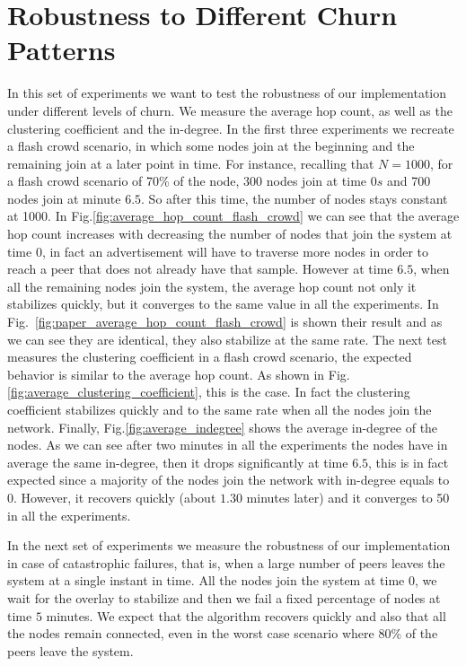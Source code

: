 \section{Robustness to Different Churn Patterns}
\label{sec:robustness}
In this set of experiments we want to test the robustness of our implementation under different levels of churn. We measure the average hop count, as well as the clustering coefficient and the in-degree. In the first three experiments we recreate a flash crowd scenario, in which some nodes join at the beginning and the remaining join at a later point in time. For instance, recalling that $N = 1000$, for a flash crowd scenario of 70\% of the node, 300 nodes join at time $0s$ and 700 nodes join at minute $6.5$. So after this time, the number of nodes stays constant at 1000. In Fig.\ref{fig:average_hop_count_flash_crowd} we can see that the average hop count increases with decreasing the number of nodes that join the system at time 0, in fact an advertisement will have to traverse more nodes in order to reach a peer that does not already have that sample. However at time $6.5$, when all the remaining nodes join the system, the average hop count not only it stabilizes quickly, but it converges to the same value in all the experiments. In Fig.~\ref{fig:paper_average_hop_count_flash_crowd} is shown their result and as we can see they are identical, they also stabilize at the same rate. The next test measures the clustering coefficient in a flash crowd scenario, the expected behavior is similar to the average hop count. As shown in Fig.\ref{fig:average_clustering_coefficient}, this is the case. In fact the clustering coefficient stabilizes quickly and to the same rate when all the nodes join the network. Finally, Fig.\ref{fig:average_indegree} shows the average in-degree of the nodes. As we can see after two minutes in all the experiments the nodes have in average the same in-degree, then it drops significantly at time $6.5$, this is in fact expected since a majority of the nodes join the network with in-degree equals to 0. However, it recovers quickly (about $1.30$ minutes later) and it converges to 50 in all the experiments.

In the next set of experiments we measure the robustness of our implementation in case of catastrophic failures, that is, when a large number of peers leaves the system at a single instant in time. All the nodes join the system at time $0$, we wait for the overlay to stabilize and then we fail a fixed percentage of nodes at time $5$ minutes. We expect that the algorithm recovers quickly and also that all the nodes remain connected, even in the worst case scenario where 80\% of the peers leave the system.

